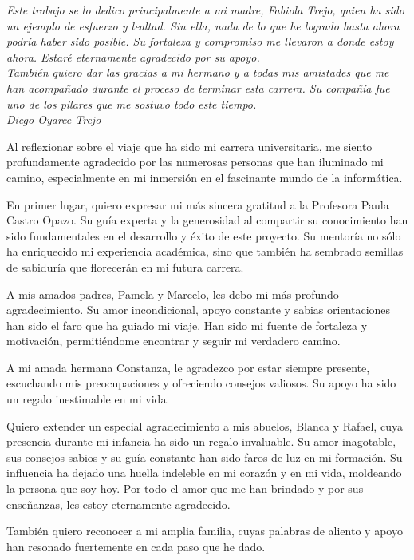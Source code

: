 \begin{flushright}
    \textit{Este trabajo se lo dedico principalmente a mi madre, Fabiola Trejo, quien ha sido un ejemplo de esfuerzo y lealtad. Sin ella, nada de lo que he logrado hasta ahora podría haber sido posible. Su fortaleza y compromiso me llevaron a donde estoy ahora. Estaré eternamente agradecido por su apoyo. \\
    También quiero dar las gracias a mi hermano y a todas mis amistades que me han acompañado durante el proceso de terminar esta carrera. Su compañía fue uno de los pilares que me sostuvo todo este tiempo. \\}
    \textit{Diego Oyarce Trejo}
\end{flushright}

\vspace{2cm}

Al reflexionar sobre el viaje que ha sido mi carrera universitaria, me siento profundamente agradecido por las numerosas personas que han iluminado mi camino, especialmente en mi inmersión en el fascinante mundo de la informática.

En primer lugar, quiero expresar mi más sincera gratitud a la Profesora Paula Castro Opazo. Su guía experta y la generosidad al compartir su conocimiento han sido fundamentales en el desarrollo y éxito de este proyecto. Su mentoría no sólo ha enriquecido mi experiencia académica, sino que también ha sembrado semillas de sabiduría que florecerán en mi futura carrera.

A mis amados padres, Pamela y Marcelo, les debo mi más profundo agradecimiento. Su amor incondicional, apoyo constante y sabias orientaciones han sido el faro que ha guiado mi viaje. Han sido mi fuente de fortaleza y motivación, permitiéndome encontrar y seguir mi verdadero camino.

A mi amada hermana Constanza, le agradezco por estar siempre presente, escuchando mis preocupaciones y ofreciendo consejos valiosos. Su apoyo ha sido un regalo inestimable en mi vida.

Quiero extender un especial agradecimiento a mis abuelos, Blanca y Rafael, cuya presencia durante mi infancia ha sido un regalo invaluable. Su amor inagotable, sus consejos sabios y su guía constante han sido faros de luz en mi formación. Su influencia ha dejado una huella indeleble en mi corazón y en mi vida, moldeando la persona que soy hoy. Por todo el amor que me han brindado y por sus enseñanzas, les estoy eternamente agradecido.

También quiero reconocer a mi amplia familia, cuyas palabras de aliento y apoyo han resonado fuertemente en cada paso que he dado.

